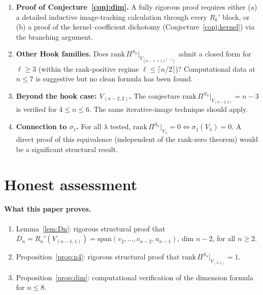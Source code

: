 \documentclass[11pt]{article}
\theoremstyle{definition}
\begin{document}
\begin{enumerate}[leftmargin=2em,topsep=0.3em,itemsep=0.2em]

\item \textbf{Proof of Conjecture~\ref{conj:dim}.} A fully rigorous
proof requires either (a) a detailed inductive image-tracking
calculation through every $R_k'$ block, or (b) a proof of the
kernel--coefficient dichotomy (Conjecture~\ref{conj:kernel}) via the
branching argument.

\item \textbf{Other Hook families.} Does
$\mathrm{rank}\,\Pi^{S_n}|_{V_{(n-\ell+1,1^{\ell-1})}}$ admit a
closed form for $\ell\ge 3$ (within the rank-positive regime
$\ell\le\lceil n/2\rceil$)? Computational data at $n\le 7$ is suggestive
but no clean formula has been found.

\item \textbf{Beyond the hook case: $V_{(n-2,2)}$.} The conjecture
$\mathrm{rank}\,\Pi^{S_n}|_{V_{(n-2,2)}}=n-3$ is verified for
$4\le n\le 6$. The same iterative-image technique should apply.

\item \textbf{Connection to $\sigma_1$.} For all $\lambda$ tested,
$\mathrm{rank}\,\Pi^{S_n}|_{V_\lambda}=0\iff\sigma_1(V_\lambda)=0$.
A direct proof of this equivalence (independent of the rank-zero
theorem) would be a significant structural result.

\end{enumerate}

\section{Honest assessment}\label{sec:honest}

\paragraph{What this paper proves.}
\begin{enumerate}[leftmargin=2em,topsep=0.3em,itemsep=0.2em]
\item Lemma~\ref{lem:Dn}: rigorous structural proof that
$D_n=R_n'(V_{(n-1,1)})=\mathrm{span}(v_2,\ldots,v_{n-2},u_{n-1})$,
dim $n-2$, for all $n\ge 2$.
\item Proposition~\ref{prop:n4}: rigorous structural proof that
$\mathrm{rank}\,\Pi^{S_4}|_{V_{(3,1)}}=1$.
\item Proposition~\ref{prop:dim}: computational verification of the
dimension formula for $n\le 8$.
\end{enumerate}
\end{document}
